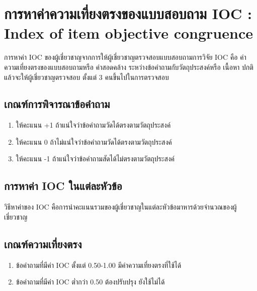 \renewcommand\thechoice{\Alph{choice}}
\newcommand\choicelabel{\thechoice.}

\newenvironment{choices}%
  {\list{\choicelabel}%
     {\usecounter{choice}\def\makelabel##1{\hss\llap{##1}}%
       \settowidth{\leftmargin}{W.\hskip\labelsep\hskip 2.5em}%
       \def\choice{%
         \item
       } %
       \labelwidth\leftmargin\advance\labelwidth-\labelsep
       \topsep=0pt
       \partopsep=0pt
     }%
  }%
  {\endlist}

\chapter{การหาค่าความเที่ยงตรงของแบบสอบถาม IOC : Index of item objective congruence}

การหาค่า IOC ของผู้เชี่ยวชาญจากการให้ผู้เชี่ยวชาญตรวจสอบแบบสอบถามการวิจัย IOC คือ ค่าความเที่ยงตรงของแบบสอบถามหรือ ค่าสอดคล้าง
ระหว่างข้อคำถามกับวัตถุประสงค์หรือ เนื้อหา ปกติแล้วจะให้ผู้เชี่ยวชาญตรวจสอบ ตั้งแต่ 3 คนขึ้นไปในการตรวจสอบ

\section{เกณฑ์การพิจารณาข้อคำถาม}
\begin{enumerate}
    \item ให้คะแนน +1 ถ้าแน่ใจว่าข้อคำถามวัดได้ตรงตามวัตถุประสงค์
    \item ให้คะแนน 0 ถ้าไม่แน่ใจว่าข้อคำถามวัดได้ตรงตามวัตถุประสงค์
    \item ให้คะแนน -1 ถ้าแน่ใจว่าข้อคำถามสัดได้ไม่ตรงตามวัตถุประสงค์
\end{enumerate}

\section{การหาค่า IOC ในแต่ละหัวข้อ}
วิธีหาค่าของ IOC คือการนำคะแนนรวมของผู้เชี่ยวชาญในแต่ละหัวข้อมาหารด้วยจำนวณของผู้เชี่ยวชาญ

\section{เกณฑ์ความเที่ยงตรง}
\begin{enumerate}
    \item ข้อคำถามที่มีค่า IOC ตั้งแต่ 0.50-1.00 มีค่าความเที่ยงตรงที่ใช้ได้
    \item ข้อคำถามที่มีค่า IOC ต่ำกว่า 0.50 ต้องปรับปรุง ยังใช้ไม่ได้
\end{enumerate}

